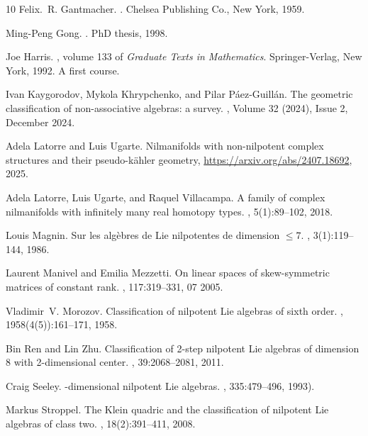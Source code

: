 \documentclass[10pt,reqno]{amsart}
\theoremstyle{definition}
\begin{document}
\begin{thebibliography}{10}
Felix.~R. Gantmacher.
.
\newblock Chelsea Publishing Co., New York, 1959.

Ming-Peng Gong.
.
\newblock PhD thesis, 1998.

Joe Harris.
, volume 133 of {\em Graduate Texts in
  Mathematics}.
\newblock Springer-Verlag, New York, 1992.
\newblock A first course.

Ivan Kaygorodov, Mykola Khrypchenko, and Pilar Páez-Guillán.
\newblock The geometric classification of non-associative algebras: a survey.
, Volume 32 (2024), Issue 2, December 2024.

Adela Latorre and Luis Ugarte.
\newblock Nilmanifolds with non-nilpotent complex structures and their pseudo-k\"ahler geometry, \url{https://arxiv.org/abs/2407.18692}, 2025.

Adela Latorre, Luis Ugarte, and Raquel Villacampa.
\newblock A family of complex nilmanifolds with infinitely many real homotopy types.
, 5(1):89--102, 2018.

Louis Magnin.
\newblock Sur les alg\`ebres de {L}ie nilpotentes de dimension {$\leq 7$}.
, 3(1):119--144, 1986.

Laurent Manivel and Emilia Mezzetti.
\newblock On linear spaces of skew-symmetric matrices of constant rank.
, 117:319--331, 07 2005.

Vladimir~V. Morozov.
\newblock Classification of nilpotent {L}ie algebras of sixth order.
, 1958(4(5)):161--171,
  1958.

Bin Ren and Lin Zhu.
\newblock Classification of 2-step nilpotent {L}ie algebras of dimension 8 with
  2-dimensional center.
, 39:2068--2081, 2011.

Craig Seeley.
-dimensional nilpotent {L}ie algebras.
, 335:479–496, 1993).

Markus Stroppel.
\newblock The {K}lein quadric and the classification of nilpotent {L}ie
  algebras of class two.
, 18(2):391--411, 2008.


\end{thebibliography}
\end{document}
